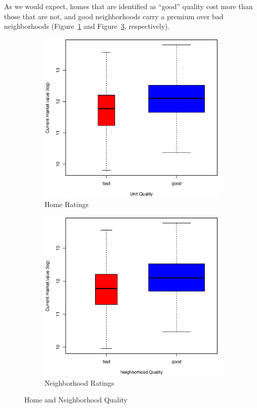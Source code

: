 \documentclass[11pt, fleqn]{article}
\begin{document}
As we would expect, homes that are identified as ``good'' quality cost more than those that are not, and good neighborhoods carry a premium over bad neighborhoods (Figure~\ref{fig:howh} and Figure~\ref{fig:hown}, respectively).

\begin{figure}
  \centering
  \begin{subfigure}[b]{0.49\textwidth}
    \includegraphics[width=\textwidth]{howh.eps}
    \caption{Home Ratings}
    \label{fig:howh}
  \end{subfigure}
  \hfill
  \begin{subfigure}[b]{0.49\textwidth}
    \includegraphics[width=\textwidth]{hown.eps}
    \caption{Neighborhood Ratings}
    \label{fig:hown}
  \end{subfigure}
  \caption{Home and Neighborhood Quality}
\end{figure}
\end{document}
